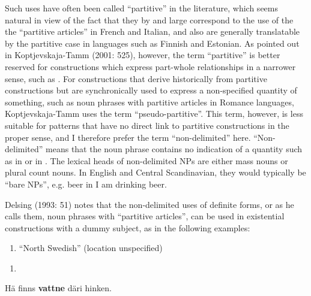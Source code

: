 Such uses have often been called “partitive” in the literature, which seems natural in view of the fact that they by and large correspond to the use of the the “partitive articles” in French and Italian, and also are generally translatable by the partitive case in languages such as Finnish and Estonian. As pointed out in Koptjevskaja-Tamm (2001: 525), however, the term “partitive” is better reserved for constructions which express part-whole relationships in a narrower sense, such as . For constructions that derive historically from partitive constructions but are synchronically used to express a non-specified quantity of something, such as noun phrases with partitive articles in Romance languages, Koptjevskaja-Tamm uses the term “pseudo-partitive”. This term, however, is less suitable for patterns that have no direct link to partitive constructions in the proper sense, and I therefore prefer the term “non-delimited” here. “Non-delimited” means that the noun phrase contains no indication of a quantity such as  in or  in . The lexical heads of non-delimited NPs are either mass nouns or plural count nouns. In English and Central Scandinavian, they would typically be “bare NPs”, e.g. beer in I am drinking beer. 

Delsing (1993: 51) notes that the non-delimited uses of definite forms, or as he calls them, noun phrases with “partitive articles”, can be used in existential constructions with a dummy subject, as in the following examples: 

\begin{enumerate} %
\item 
“North Swedish” (location unspecified)

\end{enumerate} %
\setcounter{listLFOxcviiileveli}{0}
\begin{enumerate} %
\item 
\end{enumerate} %
\ea\label{}
\gll Hä  finns  \textbf{vattne} däri  hinken.\\


